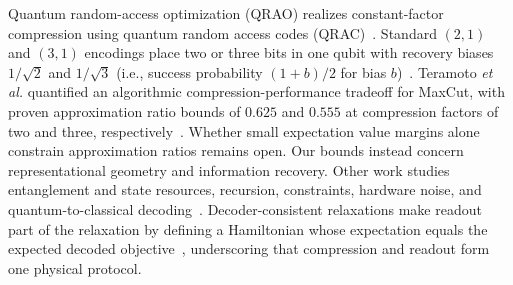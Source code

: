\documentclass[10pt,aps,pra,twocolumn,superscriptaddress,nofootinbib,longbibliography]{revtex4-2}
\begin{document}
Quantum random-access optimization (QRAO) realizes constant-factor compression using quantum random access codes (QRAC)~\cite{Fuller2024QuantumRelaxations}.  Standard $(2,1)$ and $(3,1)$ encodings place two or three bits in one qubit with recovery biases $1/\sqrt2$ and $1/\sqrt3$ (i.e., success probability $(1+b)/2$ for bias $b$)~\cite{Ambainis1999DenseCoding,Hayashi2006QRAC}.  Teramoto \emph{et al.} quantified an algorithmic compression-performance tradeoff for MaxCut, with proven approximation ratio bounds of $0.625$ and $0.555$ at compression factors of two and three, respectively~\cite{Teramoto2023QRAO}.  Whether small expectation value margins alone constrain approximation ratios remains open.  Our bounds instead concern representational geometry and information recovery.  Other work studies entanglement and state resources, recursion, constraints, hardware noise, and quantum-to-classical decoding~\cite{TeramotoRaymond2023Entanglement,Kondo2025RecursiveQRAO,SharmaRaymond2024Knapsack,Tamura2024NoiseQRAO,He2025NonvariationalQRAO,RaymondButsPistoia2025FewQubits,Suzuki2026DecoderConsistent}.  Decoder-consistent relaxations make readout part of the relaxation by defining a Hamiltonian whose expectation equals the expected decoded objective~\cite{Suzuki2026DecoderConsistent}, underscoring that compression and readout form one physical protocol.
\end{document}
